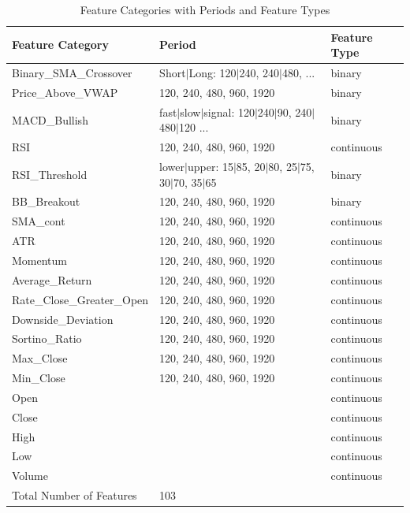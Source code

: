 \documentclass[11pt]{article}
\begin{document}
\begin{table}[h!]
    \centering
    \begin{tabular}{|l|l|l|}
    \hline
    \textbf{Feature Category} & \textbf{Period} & \textbf{Feature Type} \\ \hline
    Binary\_SMA\_Crossover & Short$|$Long: 120$|$240, 240$|$480, 
                            ...%
                            & binary \\ \hline
    Price\_Above\_VWAP & 120, 240, 480, 960, 1920 & binary \\ \hline
    MACD\_Bullish & fast$|$slow$|$signal: 120$|$240$|$90, 240$|$480$|$120
                ...%
                & binary \\ \hline
    RSI & 120, 240, 480, 960, 1920 & continuous \\ \hline
    RSI\_Threshold & lower$|$upper: 15$|$85, 20$|$80, 25$|$75, 30$|$70, 35$|$65 & binary \\ \hline
    BB\_Breakout & 120, 240, 480, 960, 1920 & binary \\ \hline
    SMA\_cont & 120, 240, 480, 960, 1920 & continuous \\ \hline
    ATR & 120, 240, 480, 960, 1920 & continuous \\ \hline
    Momentum & 120, 240, 480, 960, 1920 & continuous \\ \hline
    Average\_Return & 120, 240, 480, 960, 1920 & continuous \\ \hline
    Rate\_Close\_Greater\_Open & 120, 240, 480, 960, 1920 & continuous \\ \hline
    Downside\_Deviation & 120, 240, 480, 960, 1920 & continuous \\ \hline
    Sortino\_Ratio & 120, 240, 480, 960, 1920 & continuous \\ \hline
    Max\_Close & 120, 240, 480, 960, 1920 & continuous \\ \hline
    Min\_Close & 120, 240, 480, 960, 1920 & continuous \\ \hline
    Open &  & continuous \\ \hline
    Close &  & continuous \\ \hline
    High &  & continuous \\ \hline
    Low &  & continuous \\ \hline
    Volume &  & continuous \\ \hline
    Total Number of Features & 103 &  \\ \hline
    \end{tabular}
    \caption{Feature Categories with Periods and Feature Types}
    \label{tab:features}
\end{table}
\end{document}
